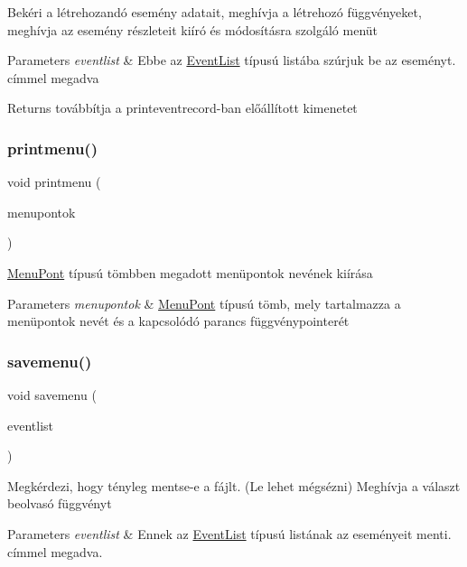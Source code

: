 Bekéri a létrehozandó esemény adatait, meghívja a létrehozó függvényeket, meghívja az esemény részleteit kiíró és módosításra szolgáló menüt 
\begin{DoxyParams}{Parameters}
{\em eventlist} & Ebbe az \hyperlink{struct_event_list}{Event\+List} típusú listába szúrjuk be az eseményt. címmel megadva \\
\hline
\end{DoxyParams}
\begin{DoxyReturn}{Returns}
továbbítja a printeventrecord-\/ban előállított kimenetet 
\end{DoxyReturn}
\mbox{\label{group__menu_gac95f6c8c1de4749a4ae8fb342329e6dc}} 
\subsubsection{\texorpdfstring{printmenu()}{printmenu()}}
{\footnotesize\ttfamily void printmenu (\begin{DoxyParamCaption}\item[{\hyperlink{struct_menu_pont}{Menu\+Pont} const $\ast$}]{menupontok }\end{DoxyParamCaption})}

\hyperlink{struct_menu_pont}{Menu\+Pont} típusú tömbben megadott menüpontok nevének kiírása 
\begin{DoxyParams}{Parameters}
{\em menupontok} & \hyperlink{struct_menu_pont}{Menu\+Pont} típusú tömb, mely tartalmazza a menüpontok nevét és a kapcsolódó parancs függvénypointerét \\
\hline
\end{DoxyParams}
\mbox{\label{group__menu_ga1e8bbce91606e9498fafa46cf96477d0}} 
\subsubsection{\texorpdfstring{savemenu()}{savemenu()}}
{\footnotesize\ttfamily void savemenu (\begin{DoxyParamCaption}\item[{\hyperlink{struct_event_list}{Event\+List} const $\ast$}]{eventlist }\end{DoxyParamCaption})}

Megkérdezi, hogy tényleg mentse-\/e a fájlt. (Le lehet mégsézni) Meghívja a választ beolvasó függvényt 
\begin{DoxyParams}{Parameters}
{\em eventlist} & Ennek az \hyperlink{struct_event_list}{Event\+List} típusú listának az eseményeit menti. címmel megadva. \\
\hline
\end{DoxyParams}
\mbox{\label{group__menu_gaa12eba16d2e2bd5dfc70240d19bd5c8e}} 
